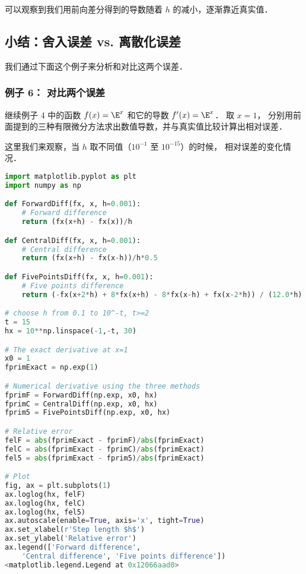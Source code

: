 可以观察到我们用前向差分得到的导数随着 $h$ 的减小，逐渐靠近真实值．

\subsection{小结：舍入误差 vs. 离散化误差}

我们通过下面这个例子来分析和对比这两个误差．

\subsubsection{例子 6： 对比两个误差}

继续例子 4 中的函数 $f(x) = \E^x$ 和它的导数 $f'(x) = \E^x$． 取 $x=1$， 分别用前面提到的三种有限微分方法求出数值导数，并与真实值比较计算出相对误差．

这里我们来观察，当 $h$ 取不同值（$10^{-1}$ 至 $10^{-15}$）的时候， 相对误差的变化情况．

\begin{lstlisting}[language=python]
import matplotlib.pyplot as plt
import numpy as np

def ForwardDiff(fx, x, h=0.001):
    # Forward difference
    return (fx(x+h) - fx(x))/h

def CentralDiff(fx, x, h=0.001):
    # Central difference
    return (fx(x+h) - fx(x-h))/h*0.5

def FivePointsDiff(fx, x, h=0.001):
    # Five points difference 
    return (-fx(x+2*h) + 8*fx(x+h) - 8*fx(x-h) + fx(x-2*h)) / (12.0*h)

# choose h from 0.1 to 10^-t, t>=2
t = 15
hx = 10**np.linspace(-1,-t, 30)

# The exact derivative at x=1
x0 = 1
fprimExact = np.exp(1)

# Numerical derivative using the three methods
fprimF = ForwardDiff(np.exp, x0, hx)
fprimC = CentralDiff(np.exp, x0, hx)
fprim5 = FivePointsDiff(np.exp, x0, hx)

# Relative error
felF = abs(fprimExact - fprimF)/abs(fprimExact)
felC = abs(fprimExact - fprimC)/abs(fprimExact)
fel5 = abs(fprimExact - fprim5)/abs(fprimExact)

# Plot
fig, ax = plt.subplots(1)
ax.loglog(hx, felF)
ax.loglog(hx, felC)
ax.loglog(hx, fel5)
ax.autoscale(enable=True, axis='x', tight=True)
ax.set_xlabel(r'Step length $h$')
ax.set_ylabel('Relative error')
ax.legend(['Forward difference',
    'Central difference', 'Five points difference'])
<matplotlib.legend.Legend at 0x12066aad0>
\end{lstlisting}

